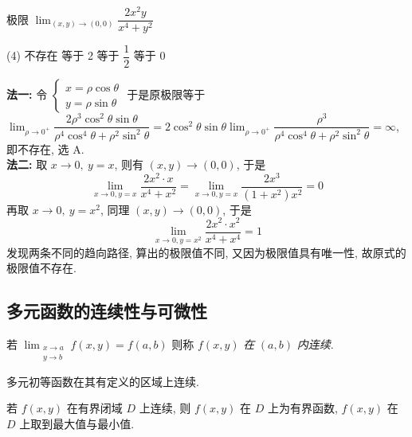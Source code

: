 \begin{example}
    极限 $\displaystyle\lim_{(x,y)\to(0,0)}\dfrac{2x^2y}{x^4+y^2}$
    \begin{tasks}(4)
        \task 不存在
        \task 等于 2
        \task 等于 $\dfrac{1}{2}$
        \task 等于 0
    \end{tasks}
\end{example}
\begin{solution}
    \textbf{法一: }令 $\begin{cases}
            x=\rho\cos\theta \\y=\rho\sin\theta
        \end{cases}$
    于是原极限等于 $\displaystyle\lim_{\rho\to0^+}\dfrac{2\rho^3\cos^2\theta\sin\theta }{\rho^4\cos^4\theta+\rho^2\sin^2\theta}=2\cos^2\theta\sin\theta\lim_{\rho\to0^+}\dfrac{\rho^3}{\rho^4\cos^4\theta+\rho^2\sin^2\theta}=\infty$, 即不存在, 选 A.\\
    \textbf{法二: }取 $x\to0,~y=x$, 则有 $(x,y)\to(0,0)$, 于是 $$\displaystyle\lim_{x\to0,y=x}\dfrac{2x^2\cdot x}{x^4+x^2}=\lim_{x\to0,y=x}\dfrac{2x^3}{(1+x^2)x^2}=0$$
    再取 $x\to0,~y=x^2$, 同理 $(x,y)\to(0,0)$, 于是 $$\displaystyle\lim_{x\to0,y=x^2}\dfrac{2x^2\cdot x^2}{x^4+x^4}=1$$
    发现两条不同的趋向路径, 算出的极限值不同, 又因为极限值具有唯一性, 故原式的极限值不存在.
\end{solution}

%     

\subsection{多元函数的连续性与可微性}

\begin{definition}[二元函数连续]
    若 $\displaystyle \lim _{\substack{x \to a \\ y \to b}} f(x, y)=f(a, b)$
    则称 $ f(x, y) $ \textit{在} $ (a, b) $ \textit{内连续}.
\end{definition}

\begin{theorem}
    多元初等函数在其有定义的区域上连续.
\end{theorem}
\begin{theorem}[闭区间多元函数的有界性]
    若 $ f(x, y) $ 在有界闭域 $ D $ 上连续, 则 $ f(x, y) $ 在 $ D $ 上为有界函数, $f(x, y) $ 在 $ D $ 上取到最大值与最小值.
\end{theorem}

